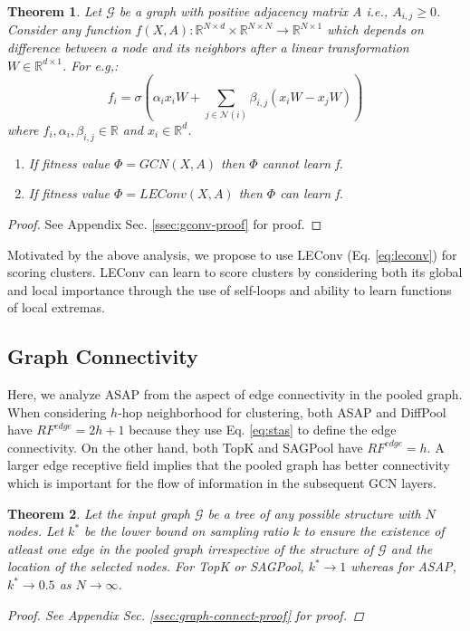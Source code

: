 \documentclass[letterpaper]{article} \usepackage{aaai20}  \usepackage{times}  \usepackage{helvet} \usepackage{courier}  \usepackage[hyphens]{url}  \usepackage{graphicx} \urlstyle{rm} \def\UrlFont{\rm}  \usepackage{graphicx}  \frenchspacing  \setlength{\pdfpagewidth}{8.5in}  \setlength{\pdfpageheight}{11in}
\newtheorem{theorem}{Theorem}
\begin{document}
\begin{theorem}
	\label{thm:gcn-score}
	Let $\mathcal{G}$ be a graph with positive adjacency matrix A i.e., $A_{i, j}\geq0$. Consider any function $f(X, A): \mathbb{R}^{N \times d} \times \mathbb{R}^{N \times N} \rightarrow \mathbb{R}^{N \times 1}$ which depends on difference between a node and its neighbors after a linear transformation $W \in \mathbb{R}^{d \times 1}$. For e.g,:
	\begin{equation}
	\nonumber
	f_{i} = \sigma(\alpha_{i}x_{i}W + \sum_{j \in \mathcal{N}(i)} \beta_{i,j} (x_{i}W - x_{j}W))
	\end{equation}
	 where $f_{i}, \alpha_{i}, \beta_{i,j} \in \mathbb{R}$ and $ x_{i} \in \mathbb{R}^{d}$.
	
	\begin{enumerate}[label=\alph*)]
		\item If fitness value $\Phi = GCN(X, A)$ then $\Phi$ cannot learn f.
		\item If fitness value $\Phi = LEConv(X, A)$ then $\Phi$ can learn f.
	\end{enumerate}
\end{theorem}

\begin{proof}
See Appendix Sec. \ref{ssec:gconv-proof} for proof.
\end{proof}
\noindent Motivated by the above analysis, we propose to use LEConv (Eq. \ref{eq:leconv}) for scoring clusters. LEConv can learn to score clusters by considering both its global and local importance through the use of self-loops and ability to learn functions of local extremas.

\subsection{Graph Connectivity}
Here, we analyze ASAP from the aspect of edge connectivity in the pooled graph. When considering $h$-hop neighborhood for clustering, both ASAP and DiffPool have $RF^{edge} = 2h+1$ because they use Eq. \eqref{eq:stas} to define the edge connectivity. On the other hand, both TopK and SAGPool have $RF^{edge} = h$. A larger edge receptive field implies that the pooled graph has better connectivity which is important for the flow of information in the subsequent GCN layers.



\begin{theorem}

\label{thm:star-graph}
	Let the input graph $\mathcal{G}$ be a tree of any possible structure with $N$ nodes. Let $k^{*}$ be the lower bound on sampling ratio $k$ to ensure the existence of atleast one edge in the pooled graph irrespective of the structure of $\mathcal{G}$ and the location of the selected nodes. For TopK or SAGPool, $k^{*} \rightarrow 1$ whereas for ASAP, $k^{*} \rightarrow 0.5$ as $N \rightarrow \infty$.
\begin{proof}
See Appendix Sec. \ref{ssec:graph-connect-proof} for proof.
\end{proof}
\end{theorem}
\end{document}
